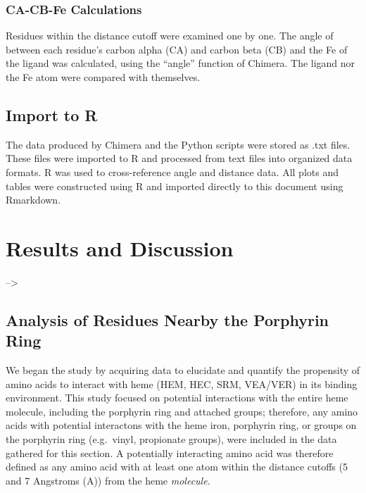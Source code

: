 \documentclass[a4paper, nobind]{templates/ociamthesis}
\begin{document}
\hypertarget{ca-cb-fe-calculations}{%
\subsection{CA-CB-Fe Calculations}\label{ca-cb-fe-calculations}}

Residues within the distance cutoff were examined one by one. The angle of between each residue's carbon alpha (CA) and carbon beta (CB) and the Fe of the ligand was calculated, using the ``angle'' function of Chimera. The ligand nor the Fe atom were compared with themselves.

\hypertarget{import-to-r}{%
\section{Import to R}\label{import-to-r}}

The data produced by Chimera and the Python scripts were stored as .txt files. These files were imported to R and processed from text files into organized data formats. R was used to cross-reference angle and distance data. All plots and tables were constructed using R and imported directly to this document using Rmarkdown.

\adjustmtc
{}

\adjustmtc
{}

\hypertarget{discussion}{%
\chapter{Results and Discussion}\label{discussion}}

\minitoc

--\textgreater{}

\hypertarget{analysis-of-residues-nearby-the-porphyrin-ring}{%
\section{Analysis of Residues Nearby the Porphyrin Ring}\label{analysis-of-residues-nearby-the-porphyrin-ring}}

We began the study by acquiring data to elucidate and quantify the propensity of amino acids to interact with heme (HEM, HEC, SRM, VEA/VER) in its binding environment. This study focused on potential interactions with the entire heme molecule, including the porphyrin ring and attached groups; therefore, any amino acids with potential interactons with the heme iron, porphyrin ring, or groups on the porphyrin ring (e.g.~vinyl, propionate groups), were included in the data gathered for this section. A potentially interacting amino acid was therefore defined as any amino acid with at least one atom within the distance cutoffs (5 and 7 Angstroms (A)) from the heme \emph{molecule}.
\end{document}
